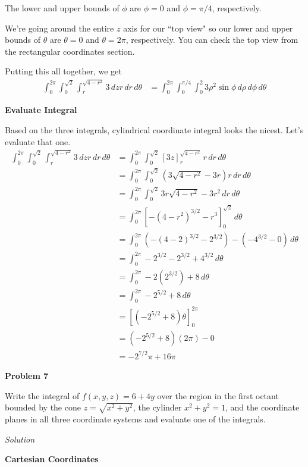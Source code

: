 \documentclass{article}
\newcommand{\lrp}[1]{\left( #1 \right)}
\newcommand{\lrb}[1]{\left[ #1 \right]}
\newcommand{\Solution}{\textit{Solution}}
\begin{document}
The lower and upper bounds of $\phi$ are $\phi = 0$ and $\phi = \pi/4$, respectively.

We're going around the entire $z$ axis for our ``top view" so our lower and upper bounds of $\theta$ are $\theta=0$ and $\theta=2\pi$, respectively. You can check the top view from the rectangular coordinates section.

Putting this all together, we get
\begin{align*}
    \int_0^{2\pi}\int_0^{\sqrt{2}}\int_r^{\sqrt{4-r^2}}3\,dzr\,dr\,d\theta&=\int_0^{2\pi}\int_0^{\pi/4}\int_0^2 3\rho^2\sin\phi\,d\rho\,d\phi\,d\theta
\end{align*}
{}\textbf{Evaluate Integral}

Based on the three integrals, cylindrical coordinate integral looks the nicest. Let's evaluate that one.
\begin{align*}
    \int_0^{2\pi}\int_0^{\sqrt{2}}\int_r^{\sqrt{4-r^2}}3\,dzr\,dr\,d\theta&=\int_0^{2\pi}\int_0^{\sqrt{2}}\lrb{3z}_r^{\sqrt{4-r^2}}\,r\,dr\,d\theta\\
    &=\int_0^{2\pi}\int_0^{\sqrt{2}} (3\sqrt{4-r^2}-3r)r\,dr\,d\theta\\
    &=\int_0^{2\pi}\int_0^{\sqrt{2}} 3r\sqrt{4-r^2}-3r^2\,dr\,d\theta\\
    &=\int_0^{2\pi} \lrb{-(4-r^2)^{3/2}-r^3}_0^{\sqrt{2}}\,d\theta\\
    &=\int_0^{2\pi} \lrp{-(4-2)^{3/2}-2^{3/2}}-\lrp{-4^{3/2}-0}\,d\theta\\
    &=\int_0^{2\pi} -2^{3/2}-2^{3/2}+4^{3/2}\,d\theta\\
    &=\int_0^{2\pi} -2(2^{3/2}) +8\,d\theta\\
    &=\int_0^{2\pi} -2^{5/2}+8\,d\theta\\
    &=\lrb{(-2^{5/2}+8)\theta}_0^{2\pi}\\
    &=(-2^{5/2}+8)(2\pi)-0\\
    &=\boxed{-2^{7/2}\pi+16\pi}
\end{align*}
\newpage
{}
{}
\textbf{Problem 7}

Write the integral of $f(x,y,z)=6+4y$ over the region in the first octant bounded by the cone $z=\sqrt{x^2+y^2}$, the cylinder $x^2+y^2=1$, and the coordinate planes in all three coordinate systems and evaluate one of the integrals.

\Solution

{}\textbf{Cartesian Coordinates}
\end{document}

